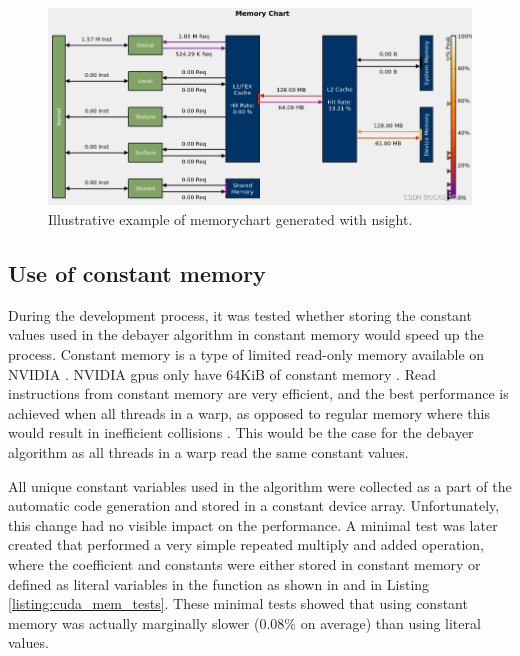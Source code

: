 \begin{figure}[H]
    \centering
    \includegraphics[width=\textwidth]{figures/cuda/cache_hits.png}
    \caption{Illustrative example of memorychart generated with \gls{nsight}. \cite{nv-computeNsightComputeMemory2022}}
    \label{fig:cache_hits}
\end{figure}


\subsection{Use of constant memory}
During the development process, it was tested whether storing the constant values used in the debayer algorithm in constant memory would speed up the process.
Constant memory is a type of limited read-only memory available on NVIDIA  \cite[61]{nvidiaCUDABestPractices2023}.
NVIDIA \glspl{gpu} only have 64KiB of constant memory \cite[61]{nvidiaCUDABestPractices2023}.
Read instructions from constant memory are very efficient, and the best performance is achieved when all threads in a warp, as opposed to regular memory where this would result in inefficient collisions \cite[61]{nvidiaCUDABestPractices2023} \cite[13,14]{volkovLatencyHiding2016}.
This would be the case for the debayer algorithm as all threads in a warp read the same constant values.

All unique constant variables used in the algorithm were collected as a part of the automatic code generation and stored in a constant device array.
Unfortunately, this change had no visible impact on the performance.
A minimal test was later created that performed a very simple repeated multiply and added operation, where the coefficient and constants were either stored in constant memory or defined as literal variables in the function as shown in  and  in Listing \ref{listing:cuda_mem_tests}.
These minimal tests showed that using constant memory was actually marginally slower (0.08\% on average) than using literal values.

